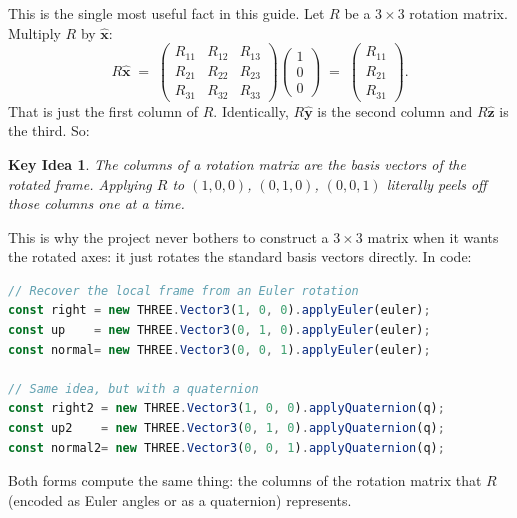 \documentclass{article}
\newtheorem*{idea}{Key Idea}
\begin{document}
This is the single most useful fact in this guide. Let $R$ be a $3 \times 3$
rotation matrix. Multiply $R$ by $\hat{\mathbf{x}}$:
\[
    R \hat{\mathbf{x}}
    \;=\;
    \begin{pmatrix} R_{11} & R_{12} & R_{13} \\ R_{21} & R_{22} & R_{23} \\ R_{31} & R_{32} & R_{33} \end{pmatrix}
    \begin{pmatrix} 1 \\ 0 \\ 0 \end{pmatrix}
    \;=\;
    \begin{pmatrix} R_{11} \\ R_{21} \\ R_{31} \end{pmatrix}.
\]
That is just the first column of $R$. Identically, $R \hat{\mathbf{y}}$ is
the second column and $R \hat{\mathbf{z}}$ is the third. So:

\begin{idea}
The columns of a rotation matrix \emph{are} the basis vectors of the rotated
frame. Applying $R$ to $(1,0,0)$, $(0,1,0)$, $(0,0,1)$ literally peels off
those columns one at a time.
\end{idea}

This is why the project never bothers to construct a $3 \times 3$ matrix when
it wants the rotated axes: it just rotates the standard basis vectors
directly. In code:

\begin{lstlisting}[language=JavaScript]
// Recover the local frame from an Euler rotation
const right = new THREE.Vector3(1, 0, 0).applyEuler(euler);
const up    = new THREE.Vector3(0, 1, 0).applyEuler(euler);
const normal= new THREE.Vector3(0, 0, 1).applyEuler(euler);

// Same idea, but with a quaternion
const right2 = new THREE.Vector3(1, 0, 0).applyQuaternion(q);
const up2    = new THREE.Vector3(0, 1, 0).applyQuaternion(q);
const normal2= new THREE.Vector3(0, 0, 1).applyQuaternion(q);
\end{lstlisting}

Both forms compute the same thing: the columns of the rotation matrix that
$R$ (encoded as Euler angles or as a quaternion) represents.
\end{document}

